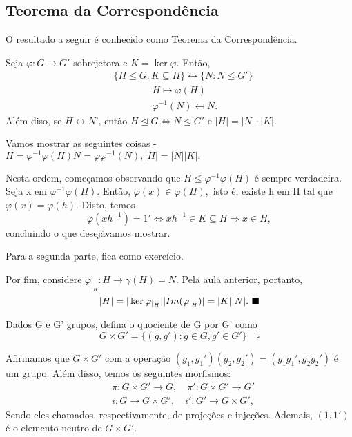 \documentclass[algebra_notes.tex]{subfiles}
\begin{document}
\subsection{Teorema da Correspondência}
O resultado a seguir é conhecido como Teorema da Correspondência.
\begin{theorem*}
	Seja $\varphi:G\rightarrow G'$ sobrejetora e $K=\ker{\varphi}.$ Então,
	\begin{align*}
		 & \{H\leq{G}: K \subseteq{H}\} \longleftrightarrow \{N: N\leq{G'}\} \\
		 & \quad\quad\quad\quad H\mapsto \varphi(H)                          \\
		 & \quad\quad\quad\quad \varphi^{-1}(N)\mapsfrom N.
	\end{align*}
	Além diso, se $H\leftrightarrow N$', então $H\trianglelefteq{G} \Longleftrightarrow N\trianglelefteq{G'}$ e
	$|H| = |N|\cdot|K|.$
\end{theorem*}
\begin{proof*}
	Vamos mostrar as seguintes coisas - $H = \varphi^{-1}\varphi(H) N = \varphi \varphi^{-1}(N), |H|=|N||K|.$

	Nesta ordem, começamos observando que $H\leq{\varphi^{-1}\varphi(H)}$ é sempre verdadeira. Seja x em $\varphi^{-1}\varphi(H).$
	Então, $\varphi(x)\in\varphi(H),$ isto é, existe h em H tal que $\varphi(x) = \varphi(h)$. Disto, temos
	$$
		\varphi(xh^{-1}) = 1' \Longleftrightarrow xh^{-1}\in K\subseteq{H} \Rightarrow x\in H,
	$$
	concluindo o que desejávamos mostrar.

	Para a segunda parte, fica como exercício.

	Por fim, considere $\varphi_{|_{H}}:H\rightarrow \gamma(H) = N$. Pela aula anterior, portanto,
	$$
		|H| = |\ker{\varphi_{|_{H}}}||Im(\varphi_{|_{H}})| = |K||N|.\text{ $\blacksquare$}
	$$
\end{proof*}
\begin{def*}
	Dados G e G' grupos, defina o quociente de G por G' como
	$$
		G\times{G'} = \{(g, g'): g\in G, g'\in G'\}\quad\square
	$$
\end{def*}
Afirmamos que $G\times{G'}$ com a operação $(g_{1}, g_{1}')(g_{2}, g_{2}') = (g_{1}g_{1}', g_{2}g_{2}')$ é um grupo.
Além disso, temos os seguintes morfismos:
\begin{align*}
	 & \pi:G\times{G'}\rightarrow G,\quad \pi':G\times{G'}\rightarrow G' \\
	 & i:G\rightarrow G\times{G'},\quad i':G'\rightarrow G\times{G'},
\end{align*}
Sendo eles chamados, respectivamente, de projeções e injeções. Ademais, $(1, 1')$ é o elemento neutro de $G\times{G'}.$
\end{document}

